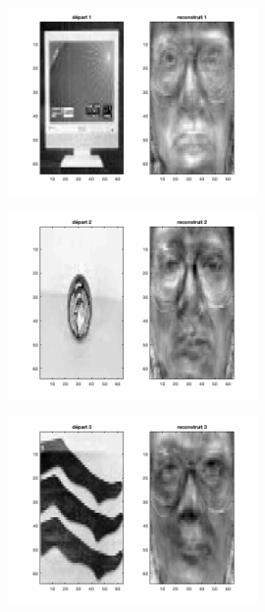 \documentclass[a4paper]{article}
\begin{document}
\begin{figure}[H]
    \centering
     
    \begin{subfigure}[c]{0.24\textwidth}
        \centering
        \includegraphics[width=0.8\textwidth]{images/ex5_noface1.png}
    \end{subfigure}
    \begin{subfigure}[c]{0.24\textwidth}
        \centering
        \includegraphics[width=0.8\textwidth]{images/ex5_noface2.png}
    \end{subfigure}    
    \begin{subfigure}[c]{0.24\textwidth}
        \centering
        \includegraphics[width=0.8\textwidth]{images/ex5_noface3.png}

\end{subfigure}
\end{figure}
\end{document}
